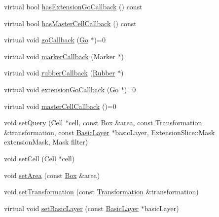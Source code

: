 \begin{DoxyCompactItemize}
\item 
virtual bool \hyperlink{classHurricane_1_1Query_afabf43cde05bf5f72d7ddfc2ec2d3ad4}{has\-Extension\-Go\-Callback} () const 
\item 
virtual bool \hyperlink{classHurricane_1_1Query_a05dfd967cbb2231dfe9e389567490eb1}{has\-Master\-Cell\-Callback} () const 
\item 
virtual void \hyperlink{classHurricane_1_1Query_a59007148bd0afa0405801f341e7e4139}{go\-Callback} (\hyperlink{classHurricane_1_1Go}{Go} $\ast$)=0
\item 
virtual void \hyperlink{classHurricane_1_1Query_a4ad5bf076073f107189d4b7ee48f040e}{marker\-Callback} (Marker $\ast$)
\item 
virtual void \hyperlink{classHurricane_1_1Query_acec322581e35c1556ce706aa5ea66aa3}{rubber\-Callback} (\hyperlink{classHurricane_1_1Rubber}{Rubber} $\ast$)
\item 
virtual void \hyperlink{classHurricane_1_1Query_a75b87e969b64caaf24ec058c0d2dfa68}{extension\-Go\-Callback} (\hyperlink{classHurricane_1_1Go}{Go} $\ast$)=0
\item 
virtual void \hyperlink{classHurricane_1_1Query_abaf97e93c7fa96469adf64f7865938b4}{master\-Cell\-Callback} ()=0
\item 
void \hyperlink{classHurricane_1_1Query_a63c50b61799b729ff4b2e7e291959b4d}{set\-Query} (\hyperlink{classHurricane_1_1Cell}{Cell} $\ast$cell, const \hyperlink{classHurricane_1_1Box}{Box} \&area, const \hyperlink{classHurricane_1_1Transformation}{Transformation} \&transformation, const \hyperlink{classHurricane_1_1BasicLayer}{Basic\-Layer} $\ast$basic\-Layer, Extension\-Slice\-::\-Mask extension\-Mask, Mask filter)
\item 
void \hyperlink{classHurricane_1_1Query_a36378e1604e484450a3ccee0ececcff7}{set\-Cell} (\hyperlink{classHurricane_1_1Cell}{Cell} $\ast$cell)
\item 
void \hyperlink{classHurricane_1_1Query_ac41de6b1535c256c4929c075769890b1}{set\-Area} (const \hyperlink{classHurricane_1_1Box}{Box} \&area)
\item 
void \hyperlink{classHurricane_1_1Query_a885360fc2f351fc3612c7dda363b5131}{set\-Transformation} (const \hyperlink{classHurricane_1_1Transformation}{Transformation} \&transformation)
\item 
virtual void \hyperlink{classHurricane_1_1Query_ac3718c4e2cd4d5e80af32558285481af}{set\-Basic\-Layer} (const \hyperlink{classHurricane_1_1BasicLayer}{Basic\-Layer} $\ast$basic\-Layer)
\item 

\end{DoxyCompactItemize}
